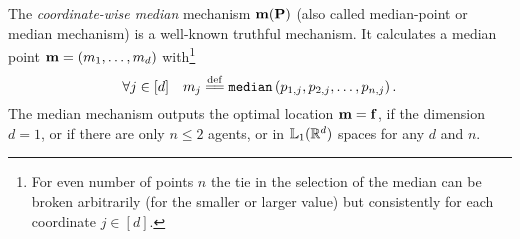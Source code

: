 The \emph{coordinate-wise median} mechanism $\median(\locs)$ (also 
called median-point or median mechanism) is a well-known 
truthful mechanism. It calculates a median point 
$\median=(m_1,\ldots,m_d)$ with\footnote{For even number of points $n$ the tie in the selection of the median can be broken arbitrarily (for the smaller or larger value) but consistently for each coordinate $j\in[d]$.}
\[
\forall j\in[d]\quad
m_j\eqdef\tmedian\left(p_{1,j},p_{2,j},\ldots,p_{n,j}\right).
\]
The median mechanism outputs the optimal location $\median=\facility$, if the dimension $d=1$, or if there are only $n\le 2$ agents, or in $\lqnorm[1](\reals^d)$ spaces for any $d$ and $n$.  
